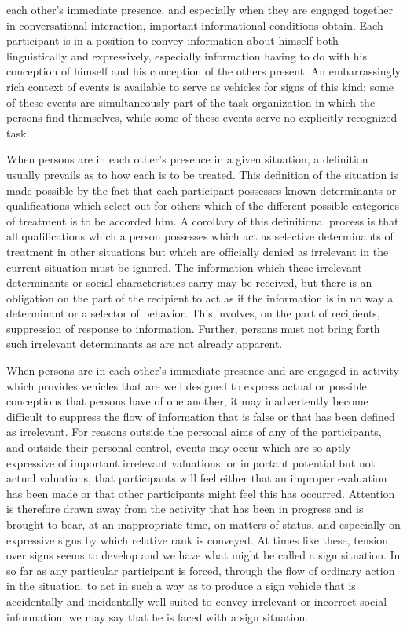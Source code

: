 \documentclass[openany,nobib]{tufte-book}
\begin{document}
each other's immediate presence, and especially when
they are engaged together in conversational interaction, important
informational conditions obtain. Each participant is in a position to
convey information about himself both linguistically and expressively,
especially information having to do with his conception of himself and
his conception of the others present. An embarrassingly rich context of
events is available to serve as vehicles for signs of this kind; some of
these events are simultaneously part of the task organization in which
the persons find themselves, while some of these events serve no
explicitly recognized task.

When persons are in each other's presence in a given situation, a
definition usually prevails as to how each is to be treated. This
definition of the situation is made possible by the fact that each
participant possesses known determinants or qualifications which select
out for others which of the different possible categories of treatment
is to be accorded him. A corollary of this definitional process is that
all qualifications which a person possesses which act as selective
determinants of treatment in other situations but which are officially
denied as irrelevant in the current situation must be ignored. The
information which these irrelevant determinants or social
characteristics carry may be received, but there is an obligation on the
part of the recipient to act as if the information is in no way a
determinant or a selector of behavior. This involves, on the part of
recipients, suppression of response to information. Further, persons
must not bring forth such irrelevant determinants as are not already
apparent.

When persons are in each other's immediate presence and are engaged in
activity which provides vehicles that are well designed to express
actual or possible conceptions that persons have of one another, it may
inadvertently become difficult to suppress the flow of information that
is false or that has been defined as irrelevant. For reasons outside the
personal aims of any of the participants, and outside their personal
control, events may occur which are so aptly expressive of important
irrelevant valuations, or important potential but not actual valuations,
that participants will feel either that an improper evaluation has been
made or that other participants might feel this has occurred. Attention
is therefore drawn away from the activity that has been in progress and
is brought to bear, at an inappropriate time, on matters of status, and
especially on expressive signs by which relative rank is conveyed. At
times like these, tension over signs seems to develop and we have what
might be called a sign situation. In so far as any particular
participant is forced, through the flow of ordinary action in the
situation, to act in such a way as to produce a sign vehicle that is
accidentally and incidentally well suited to convey irrelevant or
incorrect social information, we may say that he is faced with a sign
situation.
\end{document}
